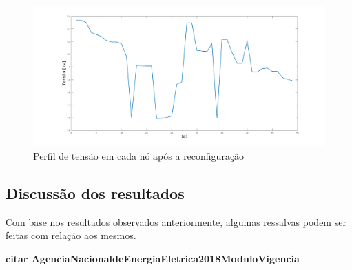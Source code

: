 





\begin{figure}[H]
    \centering
    \includegraphics[width=\textwidth]{01_img/Perfil_tensao_otim.png}
    \caption{Perfil de tensão em cada nó após a reconfiguração}
    \label{fig:voltages_otim}
\end{figure}



\subsection{Discussão dos resultados}

Com base nos resultados observados anteriormente, algumas ressalvas podem ser feitas com relação aos mesmos.

\textbf{citar AgenciaNacionaldeEnergiaEletrica2018ModuloVigencia}
